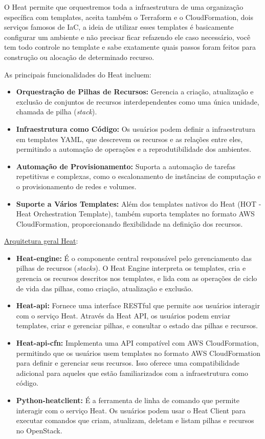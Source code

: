 O Heat permite que orquestremos toda a infraestrutura de uma organização específica com templates, aceita também o Terraform e o CloudFormation, dois serviços famosos de IaC, a ideia de utilizar esses templates é basicamente configurar um ambiente e não precisar ficar refazendo ele caso necessário, você tem todo controle no template e sabe exatamente quais passos foram feitos para construção ou alocação de determinado recurso.

As principais funcionalidades do Heat incluem:

\begin{itemize}
    \item \textbf{Orquestração de Pilhas de Recursos:} Gerencia a criação, atualização e exclusão de conjuntos de recursos interdependentes como uma única unidade, chamada de pilha (\textit{stack}).
    \item \textbf{Infraestrutura como Código:} Os usuários podem definir a infraestrutura em templates YAML, que descrevem os recursos e as relações entre eles, permitindo a automação de operações e a reprodutibilidade dos ambientes.
    \item \textbf{Automação de Provisionamento:} Suporta a automação de tarefas repetitivas e complexas, como o escalonamento de instâncias de computação e o provisionamento de redes e volumes.
    \item \textbf{Suporte a Vários Templates:} Além dos templates nativos do Heat (HOT - Heat Orchestration Template), também suporta templates no formato AWS CloudFormation, proporcionando flexibilidade na definição dos recursos.
\end{itemize}


\href{https://docs.openstack.org/heat/latest/developing_guides/architecture.html}{Arquitetura geral Heat}:

\begin{itemize}
    \item \textbf{Heat-engine:} É o componente central responsável pelo gerenciamento das pilhas de recursos (\textit{stacks}). O Heat Engine interpreta os templates, cria e gerencia os recursos descritos nos templates, e lida com as operações de ciclo de vida das pilhas, como criação, atualização e exclusão.
    \item \textbf{Heat-api:} Fornece uma interface RESTful que permite aos usuários interagir com o serviço Heat. Através da Heat API, os usuários podem enviar templates, criar e gerenciar pilhas, e consultar o estado das pilhas e recursos.
    \item \textbf{Heat-api-cfn:} Implementa uma API compatível com AWS CloudFormation, permitindo que os usuários usem templates no formato AWS CloudFormation para definir e gerenciar seus recursos. Isso oferece uma compatibilidade adicional para aqueles que estão familiarizados com a infraestrutura como código.
    \item \textbf{Python-heatclient:} É a ferramenta de linha de comando que permite interagir com o serviço Heat. Os usuários podem usar o Heat Client para executar comandos que criam, atualizam, deletam e listam pilhas e recursos no OpenStack.
\end{itemize}


